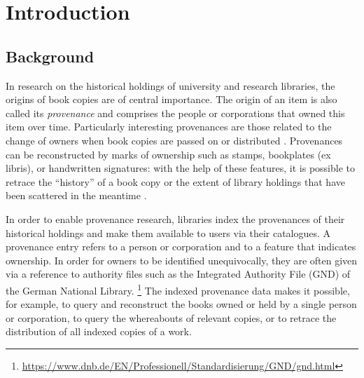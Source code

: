 \chapter{Introduction}
\label{chap:intro}

\section{Background}
\label{sec:background}


In research on the historical holdings of university and research libraries,
the origins of book copies are of central importance.
The origin of an item is also called its \emph{provenance} 
and comprises the people or corporations
that owned this item over time.
Particularly interesting provenances are those related to the change of
owners when book copies are passed on or distributed \autocite[p.\,2]{Hakelberg2016}.
Provenances can be reconstructed by marks of ownership
such as stamps, bookplates (ex libris), or handwritten signatures:
with the help of these features, it is possible to retrace
the \enquote{history} of a book copy
or the extent of library holdings that have been scattered in the meantime \autocite[p.\,2]{Hakelberg2016}.

In order to enable provenance research,
libraries index the provenances of their historical holdings
and make them available to users via their catalogues.
A provenance entry refers to a person or corporation
and to a feature that indicates ownership.
In order for owners to be identified unequivocally,
they are often given via a reference to authority files such as the
Integrated Authority File (GND) of the German National Library.%
\footnote{%
  \url{https://www.dnb.de/EN/Professionell/Standardisierung/GND/gnd.html}%
}
The indexed provenance data makes it possible, for example,
to query and reconstruct the books owned or held by a single person or corporation,
to query the whereabouts of relevant copies,
or to retrace the distribution of all indexed copies of a work.

